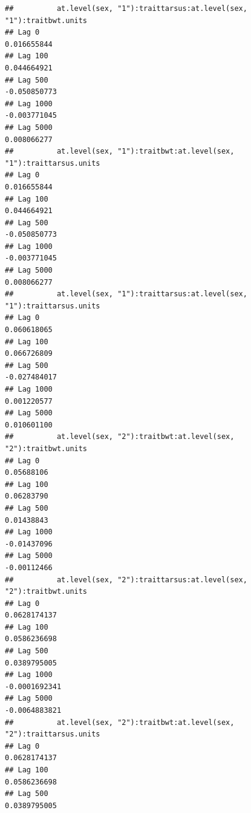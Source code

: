 \documentclass[
  12pt,
]{book}
\begin{document}
\begin{verbatim}
##          at.level(sex, "1"):traittarsus:at.level(sex, "1"):traitbwt.units
## Lag 0                                                         0.016655844
## Lag 100                                                       0.044664921
## Lag 500                                                      -0.050850773
## Lag 1000                                                     -0.003771045
## Lag 5000                                                      0.008066277
##          at.level(sex, "1"):traitbwt:at.level(sex, "1"):traittarsus.units
## Lag 0                                                         0.016655844
## Lag 100                                                       0.044664921
## Lag 500                                                      -0.050850773
## Lag 1000                                                     -0.003771045
## Lag 5000                                                      0.008066277
##          at.level(sex, "1"):traittarsus:at.level(sex, "1"):traittarsus.units
## Lag 0                                                            0.060618065
## Lag 100                                                          0.066726809
## Lag 500                                                         -0.027484017
## Lag 1000                                                         0.001220577
## Lag 5000                                                         0.010601100
##          at.level(sex, "2"):traitbwt:at.level(sex, "2"):traitbwt.units
## Lag 0                                                       0.05688106
## Lag 100                                                     0.06283790
## Lag 500                                                     0.01438843
## Lag 1000                                                   -0.01437096
## Lag 5000                                                   -0.00112466
##          at.level(sex, "2"):traittarsus:at.level(sex, "2"):traitbwt.units
## Lag 0                                                        0.0628174137
## Lag 100                                                      0.0586236698
## Lag 500                                                      0.0389795005
## Lag 1000                                                    -0.0001692341
## Lag 5000                                                    -0.0064883821
##          at.level(sex, "2"):traitbwt:at.level(sex, "2"):traittarsus.units
## Lag 0                                                        0.0628174137
## Lag 100                                                      0.0586236698
## Lag 500                                                      0.0389795005

\end{verbatim}
\end{document}
